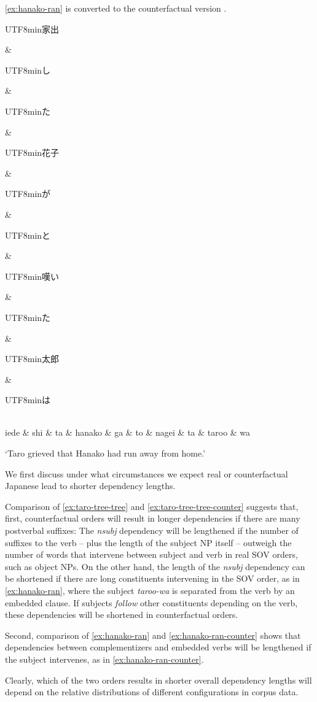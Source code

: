 \documentclass[11pt,a4paper]{article}
\newcommand{\japanese}[1]{\begin{CJK}{UTF8}{min}#1\end{CJK}}
\begin{document}
\ref{ex:hanako-ran} is converted to the counterfactual version
\ex.
\begin{dependency}[theme = simple]
   \begin{deptext}[column sep=1em]
 \japanese{家出} \& \japanese{し} \& \japanese{た} \& \japanese{花子} \& \japanese{が} \& \japanese{と} \& \japanese{嘆い} \& \japanese{た} \& \japanese{太郎} \& \japanese{は}\\
           iede \& shi \& ta \& hanako \& ga \& to \& nagei \& ta \& taroo \& wa\\ 
   \end{deptext}
\end{dependency}
`Taro grieved that Hanako had run away from home.' \citep[p. 224]{iwasaki2013japanese}\label{ex:hanako-ran-counter}




We first discuss under what circumstances we expect real or counterfactual Japanese lead to shorter dependency lengths. %

Comparison of \ref{ex:taro-tree-tree} and \ref{ex:taro-tree-tree-counter} suggests that, first, counterfactual orders will result in longer dependencies if there are many postverbal suffixes: The \textit{nsubj} dependency will be lengthened if the number of suffixes to the verb -- plus the length of the subject NP itself -- outweigh the number of words that intervene between subject and verb in real SOV orders, such as object NPs.
On the other hand, the length of the \textit{nsubj} dependency can be shortened if there are long constituents intervening in the SOV order, as in \ref{ex:hanako-ran}, where the subject \textit{taroo-wa} is separated from the verb by an embedded clause.
If subjects \emph{follow} other constituents depending on the verb, these dependencies will be shortened in counterfactual orders.

Second, comparison of \ref{ex:hanako-ran} and \ref{ex:hanako-ran-counter} shows that dependencies between complementizers and embedded verbs will be lengthened if the subject intervenes, as in \ref{ex:hanako-ran-counter}.

Clearly, which of the two orders results in shorter overall dependency lengths will depend on the relative distributions of different configurations in corpus data. %
\end{document}
